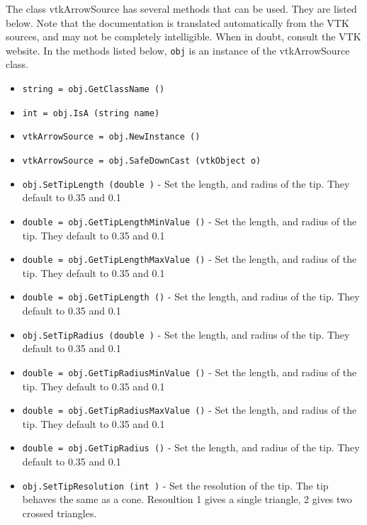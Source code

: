 The class vtkArrowSource has several methods that can be used.
  They are listed below.
Note that the documentation is translated automatically from the VTK sources,
and may not be completely intelligible.  When in doubt, consult the VTK website.
In the methods listed below, \verb|obj| is an instance of the vtkArrowSource class.
\begin{itemize}
\item  \verb|string = obj.GetClassName ()|

\item  \verb|int = obj.IsA (string name)|

\item  \verb|vtkArrowSource = obj.NewInstance ()|

\item  \verb|vtkArrowSource = obj.SafeDownCast (vtkObject o)|

\item  \verb|obj.SetTipLength (double )| -  Set the length, and radius of the tip.  They default to 0.35 and 0.1

\item  \verb|double = obj.GetTipLengthMinValue ()| -  Set the length, and radius of the tip.  They default to 0.35 and 0.1

\item  \verb|double = obj.GetTipLengthMaxValue ()| -  Set the length, and radius of the tip.  They default to 0.35 and 0.1

\item  \verb|double = obj.GetTipLength ()| -  Set the length, and radius of the tip.  They default to 0.35 and 0.1

\item  \verb|obj.SetTipRadius (double )| -  Set the length, and radius of the tip.  They default to 0.35 and 0.1

\item  \verb|double = obj.GetTipRadiusMinValue ()| -  Set the length, and radius of the tip.  They default to 0.35 and 0.1

\item  \verb|double = obj.GetTipRadiusMaxValue ()| -  Set the length, and radius of the tip.  They default to 0.35 and 0.1

\item  \verb|double = obj.GetTipRadius ()| -  Set the length, and radius of the tip.  They default to 0.35 and 0.1

\item  \verb|obj.SetTipResolution (int )| -  Set the resolution of the tip.  The tip behaves the same as a cone.
 Resoultion 1 gives a single triangle, 2 gives two crossed triangles.


\end{itemize}
